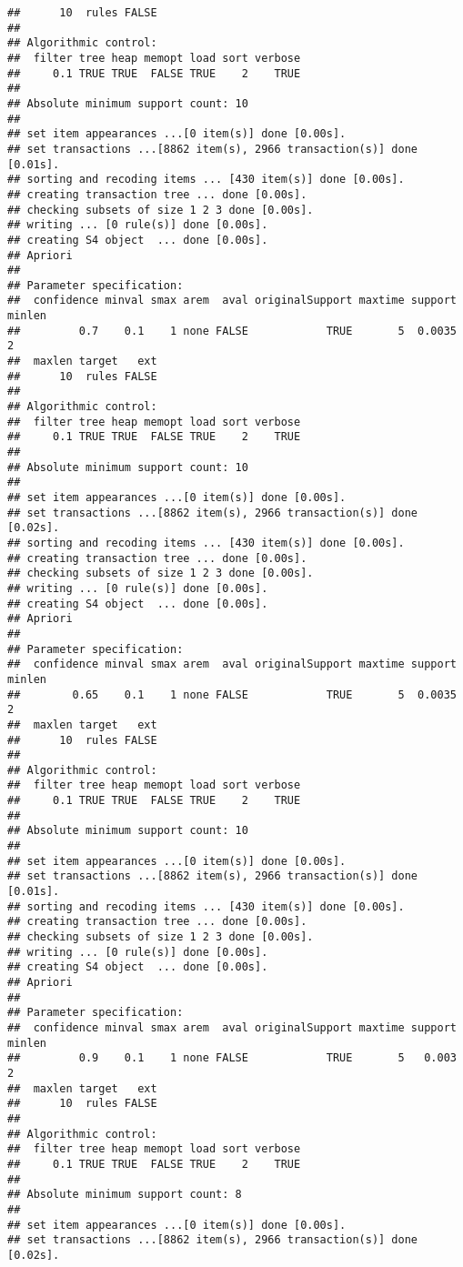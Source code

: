 \documentclass[]{article}
\begin{document}
\begin{verbatim}
##      10  rules FALSE
## 
## Algorithmic control:
##  filter tree heap memopt load sort verbose
##     0.1 TRUE TRUE  FALSE TRUE    2    TRUE
## 
## Absolute minimum support count: 10 
## 
## set item appearances ...[0 item(s)] done [0.00s].
## set transactions ...[8862 item(s), 2966 transaction(s)] done [0.01s].
## sorting and recoding items ... [430 item(s)] done [0.00s].
## creating transaction tree ... done [0.00s].
## checking subsets of size 1 2 3 done [0.00s].
## writing ... [0 rule(s)] done [0.00s].
## creating S4 object  ... done [0.00s].
## Apriori
## 
## Parameter specification:
##  confidence minval smax arem  aval originalSupport maxtime support minlen
##         0.7    0.1    1 none FALSE            TRUE       5  0.0035      2
##  maxlen target   ext
##      10  rules FALSE
## 
## Algorithmic control:
##  filter tree heap memopt load sort verbose
##     0.1 TRUE TRUE  FALSE TRUE    2    TRUE
## 
## Absolute minimum support count: 10 
## 
## set item appearances ...[0 item(s)] done [0.00s].
## set transactions ...[8862 item(s), 2966 transaction(s)] done [0.02s].
## sorting and recoding items ... [430 item(s)] done [0.00s].
## creating transaction tree ... done [0.00s].
## checking subsets of size 1 2 3 done [0.00s].
## writing ... [0 rule(s)] done [0.00s].
## creating S4 object  ... done [0.00s].
## Apriori
## 
## Parameter specification:
##  confidence minval smax arem  aval originalSupport maxtime support minlen
##        0.65    0.1    1 none FALSE            TRUE       5  0.0035      2
##  maxlen target   ext
##      10  rules FALSE
## 
## Algorithmic control:
##  filter tree heap memopt load sort verbose
##     0.1 TRUE TRUE  FALSE TRUE    2    TRUE
## 
## Absolute minimum support count: 10 
## 
## set item appearances ...[0 item(s)] done [0.00s].
## set transactions ...[8862 item(s), 2966 transaction(s)] done [0.01s].
## sorting and recoding items ... [430 item(s)] done [0.00s].
## creating transaction tree ... done [0.00s].
## checking subsets of size 1 2 3 done [0.00s].
## writing ... [0 rule(s)] done [0.00s].
## creating S4 object  ... done [0.00s].
## Apriori
## 
## Parameter specification:
##  confidence minval smax arem  aval originalSupport maxtime support minlen
##         0.9    0.1    1 none FALSE            TRUE       5   0.003      2
##  maxlen target   ext
##      10  rules FALSE
## 
## Algorithmic control:
##  filter tree heap memopt load sort verbose
##     0.1 TRUE TRUE  FALSE TRUE    2    TRUE
## 
## Absolute minimum support count: 8 
## 
## set item appearances ...[0 item(s)] done [0.00s].
## set transactions ...[8862 item(s), 2966 transaction(s)] done [0.02s].

\end{verbatim}
\end{document}
